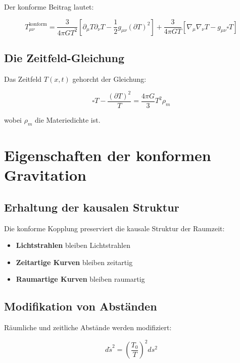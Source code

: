 \documentclass[12pt,a4paper]{report}
\begin{document}
	Der konforme Beitrag lautet:
	
	\begin{equation}
		T_{\mu\nu}^{\text{konform}} = \frac{3}{4\pi G T^2}[\partial_\mu T \partial_\nu T - \frac{1}{2}g_{\mu\nu}(\partial T)^2] + \frac{3}{4\pi G T}[\nabla_\mu\nabla_\nu T - g_{\mu\nu}\square T]
	\end{equation}
	
	\subsection{Die Zeitfeld-Gleichung}
	
	Das Zeitfeld $T(x,t)$ gehorcht der Gleichung:
	
	\begin{equation}
		\square T - \frac{(\partial T)^2}{T} = \frac{4\pi G}{3}T^2 \rho_m
	\end{equation}
	
	wobei $\rho_m$ die Materiedichte ist.
	
	\section{Eigenschaften der konformen Gravitation}
	
	\subsection{Erhaltung der kausalen Struktur}
	
	Die konforme Kopplung preserviert die kausale Struktur der Raumzeit:
	\begin{itemize}
		\item \textbf{Lichtstrahlen} bleiben Lichtstrahlen
		\item \textbf{Zeitartige Kurven} bleiben zeitartig
		\item \textbf{Raumartige Kurven} bleiben raumartig
	\end{itemize}
	
	\subsection{Modifikation von Abständen}
	
	Räumliche und zeitliche Abstände werden modifiziert:
	
	\begin{equation}
		d\tilde{s}^2 = \left(\frac{T_0}{T}\right)^2 ds^2
	\end{equation}
	
\end{document}
